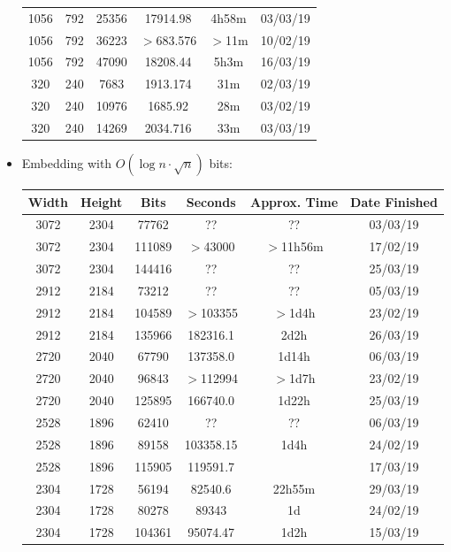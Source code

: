 \documentclass[11pt,a4paper]{report}
\begin{document}
\begin{itemize}
\begin{center}
\begin{tabular}{ c c c | c c c }
  1056 & 792 & 25356 & 17914.98 & 4h58m & 03/03/19 \\
  1056 & 792 & 36223 & $>$683.576 & $>$11m & 10/02/19 \\
  1056 & 792 & 47090 & 18208.44 & 5h3m & 16/03/19 \\
  320 & 240 & 7683 & 1913.174 & 31m & 02/03/19 \\
  320 & 240 & 10976 & 1685.92 & 28m & 03/02/19 \\
  320 & 240 & 14269 & 2034.716 & 33m & 03/03/19 \\
  \end{tabular}
  \end{center}

\newpage
\item Embedding with $O(\log{n} \cdot \sqrt{n})$ bits:
  \begin{center}
  \begin{tabular}{ c c c | c c c }
  Width & Height & Bits & Seconds & Approx. Time & Date Finished \\ \hline
  3072 & 2304 & 77762 & ?? & ?? & 03/03/19 \\ %
  3072 & 2304 & 111089 & $>$43000 & $>$11h56m & 17/02/19 \\
  3072 & 2304 & 144416 & ?? & ?? & 25/03/19 \\ %
  2912 & 2184 & 73212 & ?? & ?? & 05/03/19 \\ %
  2912 & 2184 & 104589 & $>$103355 & $>$1d4h & 23/02/19 \\
  2912 & 2184 & 135966 & 182316.1 & 2d2h & 26/03/19 \\
  2720 & 2040 & 67790 & 137358.0 & 1d14h & 06/03/19 \\
  2720 & 2040 & 96843 & $>$112994 & $>$1d7h & 23/02/19 \\
  2720 & 2040 & 125895 & 166740.0 & 1d22h & 25/03/19 \\
  2528 & 1896 & 62410 & ?? & ?? & 06/03/19 \\ %
  2528 & 1896 & 89158 & 103358.15 & 1d4h & 24/02/19 \\
  2528 & 1896 & 115905 & 119591.7 &  & 17/03/19 \\ %
  2304 & 1728 & 56194 & 82540.6 & 22h55m & 29/03/19 \\
  2304 & 1728 & 80278 & 89343 & 1d & 24/02/19 \\
  2304 & 1728 & 104361 & 95074.47 & 1d2h & 15/03/19 \\

\end{tabular}
\end{center}
\end{itemize}
\end{document}
